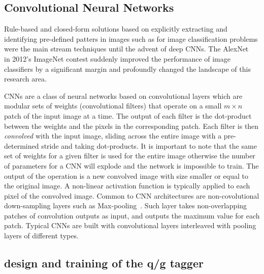 \subsection{Convolutional Neural Networks}
\label{sec:cnn-cnn}

Rule-based and closed-form solutions based on explicitly extracting and identifying pre-defined patters in images such as \cite{feifeibayesian,imagerep} for image classification problems were the main stream techniques until the advent of deep CNNs. The AlexNet~\cite{AlexNet} in 2012's ImageNet contest suddenly improved the performance of image classifiers by a significant margin and profoundly changed the landscape of this research area.

CNNs are a class of neural networks based on convolutional layers which are modular sets of weights (convolutional filters) that operate on a small $m\times n$ patch of the input image at a time. The output of each filter is the dot-product between the weights and the pixels in the corresponding patch. Each filter is then \emph{convolved} with the input image, sliding across the entire image with a pre-determined stride and taking dot-products. It is important to note that the same set of weights for a given filter is used for the entire image otherwise the number of parameters for a CNN will explode and the network is impossible to train. The output of the operation is a new convolved image with size smaller or equal to the original image. A non-linear activation function is typically applied to each pixel of the convolved image.
Common to CNN architectures are non-covolutional down-sampling layers such as Max-pooling~\cite{MAXPOOL}.
Such layer takes non-overlapping patches of convolution outputs as input, and outputs the maximum value for each patch.
Typical CNNs are built with convolutional layers interleaved with pooling layers of different types. 



\subsection{design and training of the q/g tagger}

